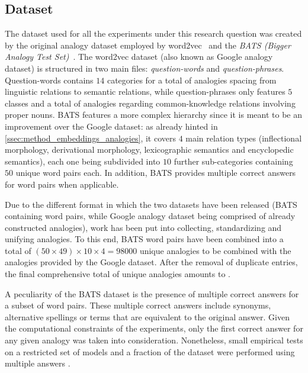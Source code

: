 \subsection{Dataset}

The dataset used for all the experiments under this research question was created by  the original analogy dataset employed by word2vec~\cite{mikolov2013} and the \emph{BATS (Bigger Analogy Test Set)}~\cite{drozd2016}.
The word2vec dataset (also known as Google analogy dataset) is structured in two main files: \emph{question-words} and \emph{question-phrases}.
Question-words contains $14$ categories for a total of  analogies spacing from linguistic relations to semantic relations, while question-phrases only features $5$ classes and a total of  analogies regarding common-knowledge relations involving proper nouns.
BATS features a more complex hierarchy since it is meant to be an improvement over the Google dataset: as already hinted in \cref{ssec:method_embeddings_analogies}, it covers $4$ main relation types (inflectional morphology, derivational morphology, lexicographic semantics and encyclopedic semantics), each one being subdivided into $10$ further sub-categories containing $50$ unique word pairs each.
In addition, BATS provides multiple correct answers for word pairs when applicable. 

Due to the different format in which the two datasets have been released (BATS containing word pairs, while Google analogy dataset being comprised of already constructed analogies),  work has been put into collecting, standardizing and unifying analogies.
To this end, BATS word pairs have been combined into a total of $(50 \times 49) \times 10 \times 4 = 98000$ unique analogies to be combined with the  analogies provided by the Google dataset.
After the removal of duplicate entries, the final comprehensive total of unique analogies amounts to .

A peculiarity of the BATS dataset is the presence of multiple correct answers for a subset of word pairs.
These multiple correct answers include synonyms, alternative spellings or terms that are equivalent to the original answer.
Given the computational constraints of the experiments, only the first correct answer for any given analogy was taken into consideration.
Nonetheless, small empirical tests on a restricted set of models and a fraction of the dataset were performed using multiple answers .

